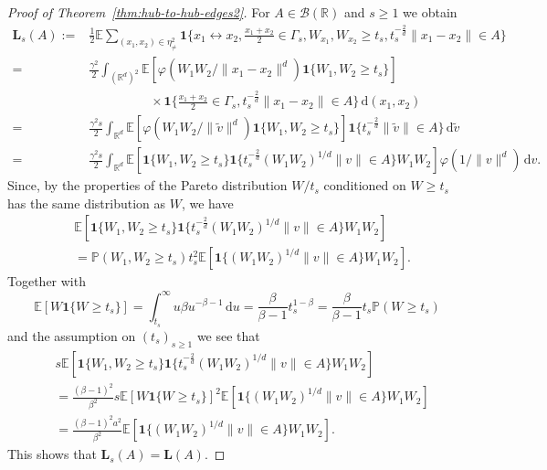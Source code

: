 \documentclass{article}
\theoremstyle{definition}
\numberwithin{equation}{section}
\theoremstyle{remark}
\begin{document}
\begin{proof}[Proof of Theorem~\ref{thm:hub-to-hub-edges2}]
For $A\in\mathcal{B}(\mathbb{R})$ and $s\ge1$ we obtain
\begin{align*}
\mathbf{L}_s(A):=& \frac{1}{2} \mathbb{E} \sum_{(x_1,x_2)\in\eta^2_{\neq}} \mathbf{1}\bigg\{x_1\leftrightarrow x_2, \frac{x_1+x_2}{2}\in \Gamma_s, W_{x_1},W_{x_2}\geq t_s, t_s^{-\frac{2}{d}} \|x_1-x_2\| \in A \bigg\} \\
= & \frac{\gamma^2}{2} \int_{(\mathbb{R}^d)^2} \mathbb{E}[\varphi(W_1W_2/\|x_1-x_2\|^d) \mathbf{1}\{W_1,W_2\geq t_s\}] \\
& \hspace{2cm} \times \mathbf{1}\bigg\{ \frac{x_1+x_2}{2}\in \Gamma_s, t_s^{-\frac{2}{d}}\|x_1-x_2\|\in A \bigg\} \, \mathrm{d}(x_1,x_2) \\
= & \frac{\gamma^2s}{2} \int_{\mathbb{R}^d} \mathbb{E}[\varphi(W_1W_2/\|\tilde{v}\|^d) \mathbf{1}\{W_1,W_2\geq t_s\}] \mathbf{1}\{t_s^{-\frac{2}{d}}\|\tilde{v}\|\in A\} \, \mathrm{d}\tilde{v} \\
= & \frac{\gamma^2s}{2} \int_{\mathbb{R}^d} \mathbb{E}[\mathbf{1}\{W_1,W_2\geq t_s\} \mathbf{1}\{t_s^{-\frac{2}{d}} (W_1W_2)^{1/d}\|v\|\in A\} W_1W_2] \varphi(1/\|v\|^d) \, \mathrm{d}v.
\end{align*}
Since, by the properties of the Pareto distribution $W/t_s$ conditioned on $W\geq t_s$ has the same distribution as $W$, we have
\begin{align*}
& \mathbb{E}[\mathbf{1}\{W_1,W_2\geq t_s\} \mathbf{1}\{t_s^{-\frac{2}{d}} (W_1W_2)^{1/d}\|v\|\in A\} W_1W_2] \\
& = \mathbb{P}(W_1,W_2\geq t_s) t_s^2 \mathbb{E}[\mathbf{1}\{(W_1W_2)^{1/d}\|v\|\in A\} W_1W_2].
\end{align*}
Together with
$$
\mathbb{E}[W\mathbf{1}\{W\geq t_s\}] = \int_{t_s}^\infty u \beta u^{-\beta-1} \, \mathrm{d}u = \frac{\beta}{\beta-1}t_s^{1-\beta} = \frac{\beta}{\beta-1}t_s \mathbb{P}(W\geq t_s)
$$
and the assumption on $(t_s)_{s\geq 1}$ we see that
\begin{align*}
& s \mathbb{E}[\mathbf{1}\{W_1,W_2\geq t_s\} \mathbf{1}\{t_s^{-\frac{2}{d}} (W_1W_2)^{1/d}\|v\|\in A\} W_1W_2] \\
& = \frac{(\beta-1)^2}{\beta^2} s \mathbb{E}[W\mathbf{1}\{W\geq t_s\}]^2 \mathbb{E}[\mathbf{1}\{(W_1W_2)^{1/d}\|v\|\in A\} W_1W_2] \\
& = \frac{(\beta-1)^2a^2}{\beta^2} \mathbb{E}[\mathbf{1}\{(W_1W_2)^{1/d}\|v\|\in A\} W_1W_2].
\end{align*}
This shows that $\mathbf{L}_s(A)=\mathbf{L}(A)$.


\end{proof}
\end{document}
